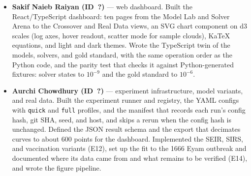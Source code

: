 \begin{itemize}
    confidence ellipse, residual bootstrap, Monte Carlo, adaptive Metropolis MCMC with $\hat R$
    and ESS, and the profile likelihood. Ran E05--E11 and E13, with per-replicate seeds so the
    parallel replicates are reproducible.
  \item \textbf{Sakif Naieb Raiyan (ID~?)} --- web dashboard. Built the React/TypeScript dashboard: ten
    pages from the Model Lab and Solver Arena to the Crossover and Real Data views, an SVG chart
    component on d3 scales (log axes, hover readout, scatter mode for sample clouds), KaTeX
    equations, and light and dark themes. Wrote the TypeScript twin of the models, solvers, and
    gold standard, with the same operation order as the Python code, and the parity test that
    checks it against Python-generated fixtures: solver states to $10^{-9}$ and the gold
    standard to $10^{-6}$.
  \item \textbf{Aurchi Chowdhury (ID~?)} --- experiment infrastructure, model variants, and real data.
    Built the experiment runner and registry, the YAML configs with \texttt{quick} and
    \texttt{full} profiles, and the manifest that records each run's config hash, git SHA, seed,
    and host, and skips a rerun when the config hash is unchanged. Defined the JSON result schema
    and the export that decimates curves to about 600 points for the dashboard. Implemented the
    SEIR, SIRS, and vaccination variants (E12), set up the fit to the 1666 Eyam outbreak and
    documented where its data came from and what remains to be verified (E14), and wrote the
    figure pipeline.
\end{itemize}

